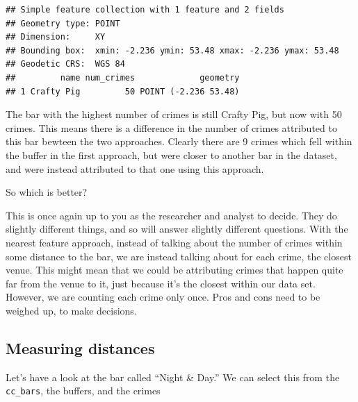 \documentclass[
  krantz2]{krantz}
\makeatletter
\newenvironment{Shaded}{\begin{snugshade}}{\end{snugshade}}
\newcommand{\CommentTok}[1]{\textcolor[rgb]{0.37,0.37,0.37}{\textit{#1}}}
\newcommand{\DecValTok}[1]{\textcolor[rgb]{0.06,0.06,0.06}{#1}}
\newcommand{\FunctionTok}[1]{\textcolor[rgb]{0,0,0}{#1}}
\newcommand{\NormalTok}[1]{#1}
\newcommand{\OtherTok}[1]{\textcolor[rgb]{0.37,0.37,0.37}{#1}}
\newcommand{\SpecialCharTok}[1]{\textcolor[rgb]{0,0,0}{#1}}
\newcommand{\StringTok}[1]{\textcolor[rgb]{0.5,0.5,0.5}{#1}}
\newenvironment{kframe}{%
\medskip{}
\setlength{\fboxsep}{.8em}
 \def\at@end@of@kframe{}%
 \ifinner\ifhmode%
  \def\at@end@of@kframe{\end{minipage}}%
  \begin{minipage}{\columnwidth}%
 \fi\fi%
 \def\FrameCommand##1{\hskip\@totalleftmargin \hskip-\fboxsep
 \colorbox{shadecolor}{##1}\hskip-\fboxsep
     \hskip-\linewidth \hskip-\@totalleftmargin \hskip\columnwidth}%
 \MakeFramed {\advance\hsize-\width
   \@totalleftmargin\z@ \linewidth\hsize
   \@setminipage}}%
 {\par\unskip\endMakeFramed%
 \at@end@of@kframe}
\renewenvironment{Shaded}{\begin{kframe}}{\end{kframe}}
\makeatother
\begin{document}
\begin{verbatim}
## Simple feature collection with 1 feature and 2 fields
## Geometry type: POINT
## Dimension:     XY
## Bounding box:  xmin: -2.236 ymin: 53.48 xmax: -2.236 ymax: 53.48
## Geodetic CRS:  WGS 84
##         name num_crimes             geometry
## 1 Crafty Pig         50 POINT (-2.236 53.48)
\end{verbatim}

The bar with the highest number of crimes is still Crafty Pig, but now with 50 crimes. This means there is a difference in the number of crimes attributed to this bar bewteen the two approaches. Clearly there are 9 crimes which fell within the buffer in the first approach, but were closer to another bar in the dataset, and were instead attributed to that one using this approach.

So which is better?

This is once again up to you as the researcher and analyst to decide. They do slightly different things, and so will answer slightly different questions. With the nearest feature approach, instead of talking about the number of crimes within some distance to the bar, we are instead talking about for each crime, the closest venue. This might mean that we could be attributing crimes that happen quite far from the venue to it, just because it's the closest within our data set. However, we are counting each crime only once. Pros and cons need to be weighed up, to make decisions.

\hypertarget{measuring-distances}{%
\subsection{Measuring distances}\label{measuring-distances}}

Let's have a look at the bar called ``Night \& Day.'' We can select this from the \texttt{cc\_bars}, the buffers, and the crimes

\begin{Shaded}
\end{Shaded}
\end{document}
